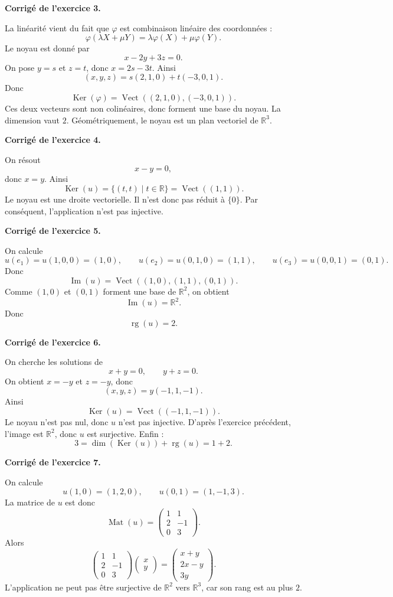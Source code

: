 \documentclass[11pt,a4paper]{article}
\newcommand{\corr}[1]{
    \vspace{0.4cm}
    \noindent\textbf{\textcolor{bleuprepa}{Corrigé de l'exercice #1.}}
    \par\vspace{0.1cm}
}
\newcommand{\R}{\mathbb{R}}
\newcommand{\Ker}{\operatorname{Ker}}
\newcommand{\Img}{\operatorname{Im}}
\newcommand{\rg}{\operatorname{rg}}
\newcommand{\Mat}{\operatorname{Mat}}
\newcommand{\Vect}{\operatorname{Vect}}
\begin{document}
\corr{3}
La linéarité vient du fait que $\varphi$ est combinaison linéaire des coordonnées :
\[
\varphi(\lambda X+\mu Y)=\lambda\varphi(X)+\mu\varphi(Y).
\]
Le noyau est donné par
\[
x-2y+3z=0.
\]
On pose $y=s$ et $z=t$, donc $x=2s-3t$. Ainsi
\[
(x,y,z)=s(2,1,0)+t(-3,0,1).
\]
Donc
\[
\Ker(\varphi)=\Vect((2,1,0),(-3,0,1)).
\]
Ces deux vecteurs sont non colinéaires, donc forment une base du noyau. La dimension vaut $2$. Géométriquement, le noyau est un plan vectoriel de $\R^3$.

\corr{4}
On résout
\[
x-y=0,
\]
donc $x=y$. Ainsi
\[
\Ker(u)=\{(t,t)\mid t\in\R\}=\Vect((1,1)).
\]
Le noyau est une droite vectorielle. Il n'est donc pas réduit à $\{0\}$. Par conséquent, l'application n'est pas injective.

\corr{5}
On calcule
\[
u(e_1)=u(1,0,0)=(1,0),\qquad
u(e_2)=u(0,1,0)=(1,1),\qquad
u(e_3)=u(0,0,1)=(0,1).
\]
Donc
\[
\Img(u)=\Vect((1,0),(1,1),(0,1)).
\]
Comme $(1,0)$ et $(0,1)$ forment une base de $\R^2$, on obtient
\[
\Img(u)=\R^2.
\]
Donc
\[
\rg(u)=2.
\]

\corr{6}
On cherche les solutions de
\[
x+y=0,\qquad y+z=0.
\]
On obtient $x=-y$ et $z=-y$, donc
\[
(x,y,z)=y(-1,1,-1).
\]
Ainsi
\[
\Ker(u)=\Vect((-1,1,-1)).
\]
Le noyau n'est pas nul, donc $u$ n'est pas injective. D'après l'exercice précédent, l'image est $\R^2$, donc $u$ est surjective. Enfin :
\[
3=\dim(\Ker(u))+\rg(u)=1+2.
\]

\corr{7}
On calcule
\[
u(1,0)=(1,2,0),\qquad u(0,1)=(1,-1,3).
\]
La matrice de $u$ est donc
\[
\Mat(u)=
\begin{pmatrix}
1&1\\
2&-1\\
0&3
\end{pmatrix}.
\]
Alors
\[
\begin{pmatrix}
1&1\\
2&-1\\
0&3
\end{pmatrix}
\begin{pmatrix}x\\y\end{pmatrix}
=
\begin{pmatrix}
x+y\\
2x-y\\
3y
\end{pmatrix}.
\]
L'application ne peut pas être surjective de $\R^2$ vers $\R^3$, car son rang est au plus $2$.
\end{document}
